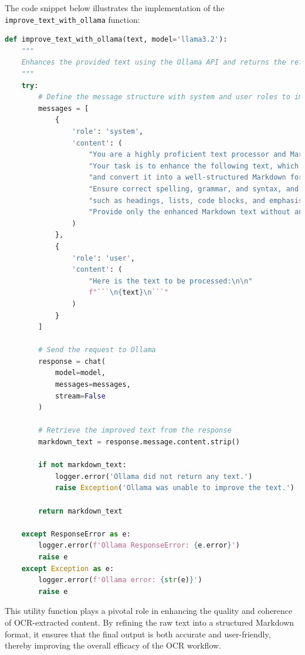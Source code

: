 The code snippet below illustrates the implementation of the \texttt{improve\_text\_with\_ollama} function:

\begin{lstlisting}[language=Python, caption={improve\_text\_with\_ollama Utility Function}]
def improve_text_with_ollama(text, model='llama3.2'):
    """
    Enhances the provided text using the Ollama API and returns the refined Markdown text.
    """
    try:
        # Define the message structure with system and user roles to improve the text
        messages = [
            {
                'role': 'system',
                'content': (
                    "You are a highly proficient text processor and Markdown expert. "
                    "Your task is to enhance the following text, which has been extracted via OCR from an image, "
                    "and convert it into a well-structured Markdown format. "
                    "Ensure correct spelling, grammar, and syntax, and format the text using appropriate Markdown elements "
                    "such as headings, lists, code blocks, and emphasis. "
                    "Provide only the enhanced Markdown text without any additional commentary or explanations."
                )
            },
            {
                'role': 'user',
                'content': (
                    "Here is the text to be processed:\n\n"
                    f"```\n{text}\n```"
                )
            }
        ]

        # Send the request to Ollama
        response = chat(
            model=model,
            messages=messages,
            stream=False
        )

        # Retrieve the improved text from the response
        markdown_text = response.message.content.strip()

        if not markdown_text:
            logger.error('Ollama did not return any text.')
            raise Exception('Ollama was unable to improve the text.')

        return markdown_text

    except ResponseError as e:
        logger.error(f'Ollama ResponseError: {e.error}')
        raise e
    except Exception as e:
        logger.error(f'Ollama error: {str(e)}')
        raise e
\end{lstlisting}

This utility function plays a pivotal role in enhancing the quality and coherence of OCR-extracted content. By refining the raw text into a structured Markdown format, it ensures that the final output is both accurate and user-friendly, thereby improving the overall efficacy of the OCR workflow.


